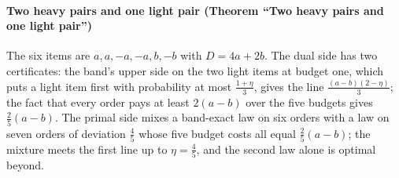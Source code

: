 \paragraph{Two heavy pairs and one light pair (Theorem ``Two heavy pairs and one light pair'')}
The six items are $a,a,-a,-a,b,-b$ with $D=4a+2b$. The dual side has two certificates: the band's
upper side on the two light items at budget one, which puts a light item first with probability at
most $\frac{1+\eta}3$, gives the line $\frac{(a-b)(2-\eta)}3$; the fact that every order pays at least
$2(a-b)$ over the five budgets gives $\frac25(a-b)$. The primal side mixes a band-exact law on six
orders with a law on seven orders of deviation $\frac45$ whose five budget costs all equal
$\frac25(a-b)$; the mixture meets the first line up to $\eta=\frac45$, and the second law alone is
optimal beyond.

